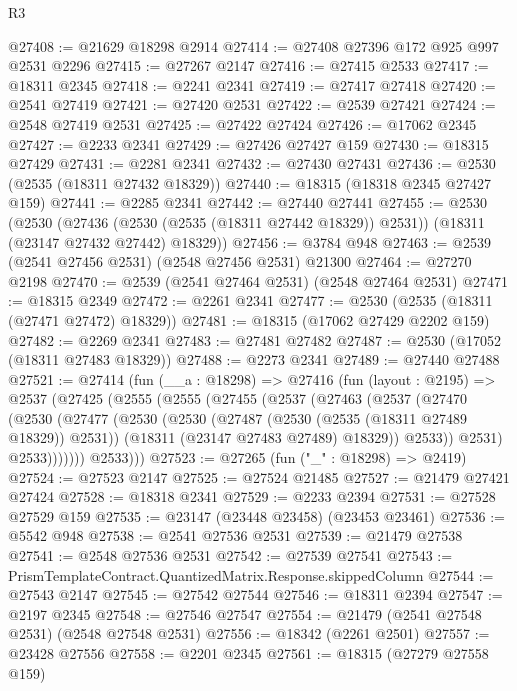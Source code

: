 \begin{lexlean}{R3}
\begin{coremodule}
@27408 := @21629 @18298 @2914
@27414 := @27408 @27396 @172 @925 @997 @2531 @2296
@27415 := @27267 @2147
@27416 := @27415 @2533
@27417 := @18311 @2345
@27418 := @2241 @2341
@27419 := @27417 @27418
@27420 := @2541 @27419
@27421 := @27420 @2531
@27422 := @2539 @27421
@27424 := @2548 @27419 @2531
@27425 := @27422 @27424
@27426 := @17062 @2345
@27427 := @2233 @2341
@27429 := @27426 @27427 @159
@27430 := @18315 @27429
@27431 := @2281 @2341
@27432 := @27430 @27431
@27436 := @2530 (@2535 (@18311 @27432 @18329))
@27440 := @18315 (@18318 @2345 @27427 @159)
@27441 := @2285 @2341
@27442 := @27440 @27441
@27455 := @2530
    (@2530
      (@27436 (@2530 (@2535 (@18311 @27442 @18329)) @2531))
      (@18311 (@23147 @27432 @27442) @18329))
@27456 := @3784 @948
@27463 := @2539 (@2541 @27456 @2531) (@2548 @27456 @2531) @21300
@27464 := @27270 @2198
@27470 := @2539 (@2541 @27464 @2531) (@2548 @27464 @2531)
@27471 := @18315 @2349
@27472 := @2261 @2341
@27477 := @2530 (@2535 (@18311 (@27471 @27472) @18329))
@27481 := @18315 (@17062 @27429 @2202 @159)
@27482 := @2269 @2341
@27483 := @27481 @27482
@27487 := @2530 (@17052 (@18311 @27483 @18329))
@27488 := @2273 @2341
@27489 := @27440 @27488
@27521 := @27414
    (fun (__a : @18298) =>
    @27416
      (fun (layout : @2195) =>
      @2537
        (@27425
          (@2555
            (@2555
              (@27455
                (@2537
                  (@27463
                    (@2537
                      (@27470
                        (@2530
                          (@27477
                            (@2530
                              (@2530
                                (@27487 (@2530 (@2535 (@18311 @27489 @18329)) @2531))
                                (@18311 (@23147 @27483 @27489) @18329))
                              @2533))
                          @2531)
                        @2533)))))))
          @2533)))
@27523 := @27265 (fun ("_" : @18298) => @2419)
@27524 := @27523 @2147
@27525 := @27524 @21485
@27527 := @21479 @27421 @27424
@27528 := @18318 @2341
@27529 := @2233 @2394
@27531 := @27528 @27529 @159
@27535 := @23147 (@23448 @23458) (@23453 @23461)
@27536 := @5542 @948
@27538 := @2541 @27536 @2531
@27539 := @21479 @27538
@27541 := @2548 @27536 @2531
@27542 := @27539 @27541
@27543 := PrismTemplateContract.QuantizedMatrix.Response.skippedColumn
@27544 := @27543 @2147
@27545 := @27542 @27544
@27546 := @18311 @2394
@27547 := @2197 @2345
@27548 := @27546 @27547
@27554 := @21479 (@2541 @27548 @2531) (@2548 @27548 @2531)
@27556 := @18342 (@2261 @2501)
@27557 := @23428 @27556
@27558 := @2201 @2345
@27561 := @18315 (@27279 @27558 @159)

\end{coremodule}
\end{lexlean}
